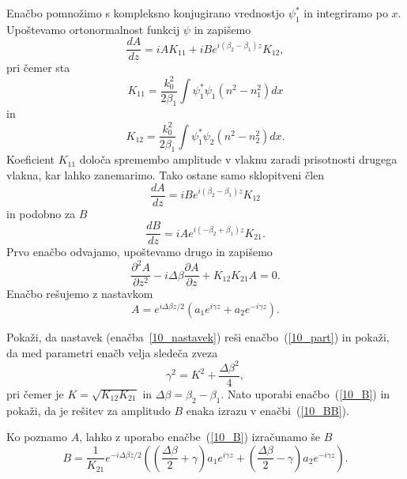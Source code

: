 Enačbo pomnožimo s kompleksno konjugirano vrednostjo $\psi_1^*$ in integriramo po $x$.
Upoštevamo ortonormalnost funkcij $\psi$ in zapišemo 
\begin{equation}
\frac{dA}{dz} = i A K_{11}+i B e^{i(\beta_2-\beta_1)z} K_{12},
\end{equation}
pri čemer sta
\begin{equation}
K_{11}= \frac{k_0^2}{2 \beta_1}\int\psi_1^*\psi_1 (n^2-n_1^2)dx
\end{equation}
in 
\begin{equation}
K_{12}= \frac{k_0^2}{2 \beta_1}\int\psi_1^*\psi_2 (n^2-n_2^2)dx.
\end{equation}
Koeficient $K_{11}$ določa spremembo amplitude v vlaknu zaradi prisotnosti 
drugega vlakna, kar lahko zanemarimo. Tako ostane samo sklopitveni člen
\begin{equation}
\frac{dA}{dz} = i B e^{i(\beta_2-\beta_1)z} K_{12}
\label{10_B}
\end{equation}
in podobno za $B$
\begin{equation}
\frac{dB}{dz} = i A e^{i(-\beta_2+\beta_1)z} K_{21}.
\end{equation}
Prvo enačbo odvajamo, upoštevamo drugo in zapišemo
\begin{equation}
\frac{\partial^2 A}{\partial z^2}-i \Delta \beta \frac{\partial A}{\partial z} + K_{12}K_{21}A = 0.
\label{10_part}
\end{equation}
Enačbo rešujemo z nastavkom 
\begin{equation}
A = e^{i \Delta \beta z/2}\left( a_1 e^{i \gamma z} + a_2 e^{-i \gamma z}\right).
\label{10_nastavek}
\end{equation}
\begin{definition}
 Pokaži, da  nastavek (enačba~\ref{10_nastavek}) reši enačbo~(\ref{10_part}) in pokaži,
 da med parametri enačb velja sledeča zveza
 \begin{equation}
 \gamma^2 = K^2 + \frac{\Delta \beta ^2}{4},
 \end{equation}
 pri čemer je $K = \sqrt{K_{12}K_{21}}$ in $\Delta \beta = \beta_2 - \beta_1$. 
 Nato uporabi enačbo~(\ref{10_B}) in pokaži, da je rešitev za amplitudo $B$
 enaka izrazu v enačbi~(\ref{10_BB}).
\end{definition}
Ko poznamo $A$, lahko z uporabo enačbe~(\ref{10_B}) izračunamo še $B$
\begin{equation}
B = \frac{1}{K_{21}}
e^{-i \Delta \beta z/2}\left(\left(\frac{\Delta \beta}{2} +\gamma \right) a_1 e^{i \gamma z} + 
\left(\frac{\Delta \beta}{2} -\gamma \right)a_2 e^{-i \gamma z}\right).
\label{10_BB}
\end{equation}
